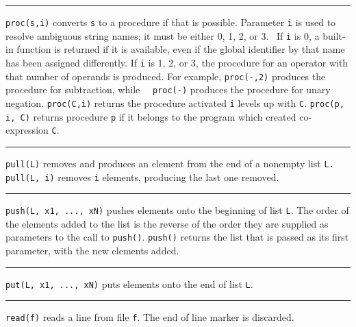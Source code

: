 \bigskip\hrule\vspace{0.1cm}

\noindent
{}\texttt{proc(s,i)} converts \texttt{s} to a procedure
if that is possible. Parameter \texttt{i} is used to resolve ambiguous
string names; it must be either 0, 1, 2, or 3. \ If \texttt{i} is 0, a
built-in function is returned if it is available, even if the global
identifier by that name has been assigned differently. If \texttt{i} is
1, 2, or 3, the procedure for an operator with that number of operands
is produced. For example,
\texttt{proc({\textquotedbl}-{\textquotedbl},2)} produces the procedure
for subtraction, while
\ \ \texttt{proc({\textquotedbl}-{\textquotedbl})} produces the
procedure for unary negation. \texttt{proc(C,i)} returns the procedure
activated \texttt{i} levels up with \texttt{C}. \texttt{proc(p, i, C)}
returns procedure \texttt{p} if it belongs to the program which created
co-expression \texttt{C}.

\bigskip\hrule\vspace{0.1cm}

\noindent
{}\texttt{pull(L)} removes and produces an element from the
end of a nonempty list \texttt{L.} \texttt{pull(L, i)} removes
\texttt{i} elements, producing the last one removed.

\bigskip\hrule\vspace{0.1cm}

\noindent
\texttt{push(L, x1, ..., xN)} pushes elements onto the beginning of list
\texttt{L}. The order of the elements added to the list is the reverse
of the order they are supplied as parameters to the call to
\texttt{push()}. \texttt{push()} returns the list that is
passed as its first parameter, with the new elements added.

\hrule\vspace{0.1cm}

\noindent
{}\texttt{put(L, x1, ..., xN)} puts elements onto the end of
list \texttt{L}.

\bigskip\hrule\vspace{0.1cm}

\noindent
{}\texttt{read(f)} reads a line from file \texttt{f}. The
end of line marker is discarded.

